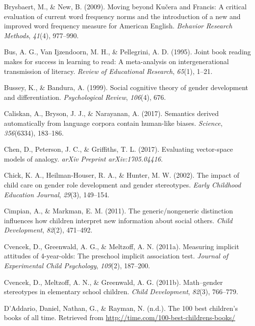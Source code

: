 \documentclass[
  english,
  ,man,floatsintext]{apa6}
\begin{document}
\leavevmode\hypertarget{ref-brysbaert2009moving}{}%
Brysbaert, M., \& New, B. (2009). Moving beyond Kučera and Francis: A critical evaluation of current word frequency norms and the introduction of a new and improved word frequency measure for American English. \emph{Behavior Research Methods}, \emph{41}(4), 977--990.

\leavevmode\hypertarget{ref-bus1995joint}{}%
Bus, A. G., Van Ijzendoorn, M. H., \& Pellegrini, A. D. (1995). Joint book reading makes for success in learning to read: A meta-analysis on intergenerational transmission of literacy. \emph{Review of Educational Research}, \emph{65}(1), 1--21.

\leavevmode\hypertarget{ref-bussey1999social}{}%
Bussey, K., \& Bandura, A. (1999). Social cognitive theory of gender development and differentiation. \emph{Psychological Review}, \emph{106}(4), 676.

\leavevmode\hypertarget{ref-caliskan2017semantics}{}%
Caliskan, A., Bryson, J. J., \& Narayanan, A. (2017). Semantics derived automatically from language corpora contain human-like biases. \emph{Science}, \emph{356}(6334), 183--186.

\leavevmode\hypertarget{ref-chen2017evaluating}{}%
Chen, D., Peterson, J. C., \& Griffiths, T. L. (2017). Evaluating vector-space models of analogy. \emph{arXiv Preprint arXiv:1705.04416}.

\leavevmode\hypertarget{ref-chick2002impact}{}%
Chick, K. A., Heilman-Houser, R. A., \& Hunter, M. W. (2002). The impact of child care on gender role development and gender stereotypes. \emph{Early Childhood Education Journal}, \emph{29}(3), 149--154.

\leavevmode\hypertarget{ref-cimpian2011generic}{}%
Cimpian, A., \& Markman, E. M. (2011). The generic/nongeneric distinction influences how children interpret new information about social others. \emph{Child Development}, \emph{82}(2), 471--492.

\leavevmode\hypertarget{ref-cvencek2011measuring}{}%
Cvencek, D., Greenwald, A. G., \& Meltzoff, A. N. (2011a). Measuring implicit attitudes of 4-year-olds: The preschool implicit association test. \emph{Journal of Experimental Child Psychology}, \emph{109}(2), 187--200.

\leavevmode\hypertarget{ref-cvencek2011math}{}%
Cvencek, D., Meltzoff, A. N., \& Greenwald, A. G. (2011b). Math--gender stereotypes in elementary school children. \emph{Child Development}, \emph{82}(3), 766--779.

\leavevmode\hypertarget{ref-time_100_kidbooks}{}%
D'Addario, Daniel, Nathan, G., \& Rayman, N. (n.d.). The 100 best children's books of all time. Retrieved from \url{http://time.com/100-best-childrens-books/}
\end{document}
